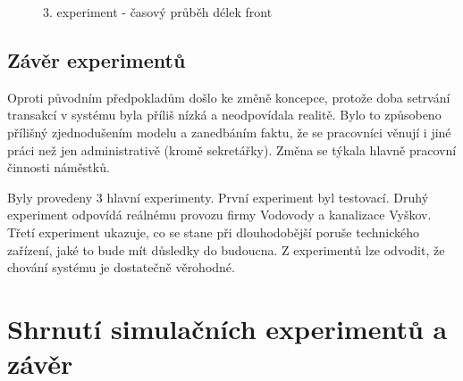 \documentclass[12pt,a4paper]{article}
\begin{document}
\begin{figure}[ht]
 \begin{center}
    \caption{3. experiment - časový průběh délek front}
    \label{exp3_graf}
 \end{center}
\end{figure}


\subsection{Závěr experimentů}
Oproti původním předpokladům došlo ke změně koncepce, protože doba setrvání trans\-ak\-cí v systému byla příliš nízká a neodpovídala realitě. Bylo to způsobeno přílišný zjed\-no\-du\-še\-ním modelu a zanedbáním faktu, že se pracovníci věnují i jiné práci než jen administrativě (kromě sekretářky). Změna se týkala hlavně pracovní činnosti náměstků.

Byly provedeny 3 hlavní experimenty. První experiment byl testovací. Druhý experiment odpovídá reálnému provozu firmy Vodovody a kanalizace Vyškov. Třetí experiment ukazuje, co se stane při dlouhodobější poruše technického zařízení, jaké to bude mít důsledky do budoucna. Z experimentů lze odvodit, že chování systému je dostatečně věrohodné. 


\newpage


\section{Shrnutí simulačních experimentů a závěr}
\end{document}
